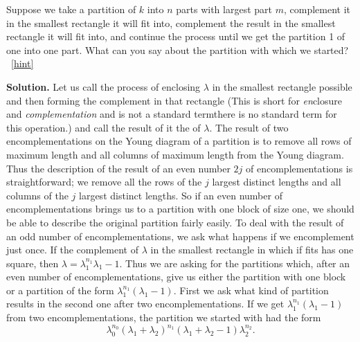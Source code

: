 \documentclass{book}
\begin{document}
\setcounter{project}{309}
\addtocounter{project}{-1}
\begin{activity}[]\label{activity-302}
\hypertarget{p-1583}{}%
Suppose we take a partition of \(k\) into \(n\) parts with largest part \(m\), complement it in the smallest rectangle it will fit into, complement the result in the smallest rectangle it will fit into, and continue the process until we get the partition 1 of one into one part.  What can you say about the partition with which we started?%
~\hfill{\tiny\hyperlink{a-309}{[hint]}\hypertarget{q-309}{}}\par\smallskip%
\noindent\textbf{Solution.}\hypertarget{solution-228}{}\quad%
\hypertarget{p-1586}{}%
Let us call the process of enclosing \(\lambda\) in the smallest rectangle possible and then forming the complement in that rectangle  (This is short for \emph{en}\/closure and \emph{complementation} and is not a standard term\textemdash{}there is no standard term for this operation.) and call the result of it the  of \(\lambda\).  The result of two encomplementations on the Young diagram of a partition is to remove all rows of maximum length and all columns of maximum length from the Young diagram. Thus the description of the result of an even number \(2j\) of encomplementations is straightforward; we remove all the rows of the \(j\) largest distinct lengths and all columns of the \(j\) largest distinct lengths. So if an even number of encomplementations brings us to a partition with one block of size one, we should be able to describe the original partition fairly easily. To deal with the result of an odd number of encomplementations, we ask what happens if we encomplement just once.  If the complement of \(\lambda\) in the smallest rectangle in which if fits has one square, then \(\lambda =\lambda_1^{n_1}\lambda_1-1\). Thus we are asking for the partitions which, after an even number of encomplementations, give us either the partition with one block or a partition of the form \(\lambda_1^{n_1}(\lambda_1-1)\). First we ask what kind of partition results in the second one after two encomplementations. If we get \(\lambda_1^{n_1}(\lambda_1-1)\) from two encomplementations, the partition we started with had the form%
\begin{equation*}
\lambda_0^{n_0}(\lambda_1+\lambda_{2})^{n_1}(\lambda_1+
\lambda_2-1)\lambda_2^{n_2}.
\end{equation*}
%
\par
\hypertarget{p-1587}{}%

\end{activity}
\end{document}
